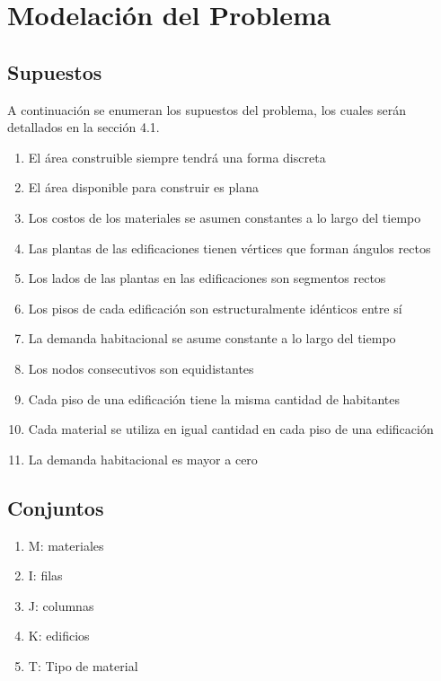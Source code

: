 \documentclass[letterpaper]{article}
\begin{document}
\section{Modelación del Problema}
\subsection{Supuestos}
\noindent A continuación se enumeran los supuestos del problema, los cuales serán detallados en la sección 4.1.
\begin{enumerate}
	\setlength\itemsep{0.00003em}
	\item El área construible siempre tendrá una forma discreta
	\item El área disponible para construir es plana
	\item Los costos de los materiales se asumen constantes a lo largo del tiempo
	\item Las plantas de las edificaciones tienen vértices que forman ángulos rectos
	\item Los lados de las plantas en las edificaciones son segmentos rectos
 	\item Los pisos de cada edificación son estructuralmente idénticos entre sí
	\item La demanda habitacional se asume constante a lo largo del tiempo
	\item Los nodos consecutivos son equidistantes
	\item Cada piso de una edificación tiene la misma cantidad de habitantes
	\item Cada material se utiliza en igual cantidad en cada piso de una edificación
	\item La demanda habitacional es mayor a cero
\end{enumerate}

\subsection{Conjuntos}
\begin{enumerate}
	\setlength\itemsep{0.000003em}
	\item M: materiales
	\item I: filas
	\item J: columnas
	\item K: edificios
	\item T: Tipo de material
\end{enumerate}
\end{document}
